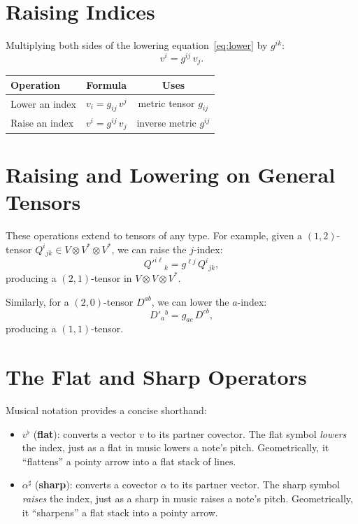\documentclass[12pt, a4paper]{report}
\theoremstyle{definition}
\theoremstyle{plain}
\theoremstyle{remark}
\begin{document}
\section{Raising Indices}

Multiplying both sides of the lowering equation~\eqref{eq:lower} by $g^{ik}$:
\begin{equation}\label{eq:raise}
    \boxed{v^{i} = g^{ij}\, v_j.}
\end{equation}

\begin{center}
\renewcommand{\arraystretch}{1.3}
\begin{tabular}{lcc}
    \toprule
    \textbf{Operation} & \textbf{Formula} & \textbf{Uses} \\
    \midrule
    Lower an index & $v_i = g_{ij}\,v^{j}$ & metric tensor $g_{ij}$ \\
    Raise an index & $v^{i} = g^{ij}\,v_j$  & inverse metric $g^{ij}$ \\
    \bottomrule
\end{tabular}
\end{center}

\section{Raising and Lowering on General Tensors}

These operations extend to tensors of any type.  For example, given a $(1,2)$-tensor
$Q^{i}{}_{jk} \in V \otimes V^* \otimes V^*$, we can raise the $j$-index:
\[
    Q'^{i\ell}{}_{k} = g^{\ell j}\, Q^{i}{}_{jk},
\]
producing a $(2,1)$-tensor in $V \otimes V \otimes V^*$.

Similarly, for a $(2,0)$-tensor $D^{ab}$, we can lower the $a$-index:
\[
    D'_{a}{}^{b} = g_{ac}\, D^{cb},
\]
producing a $(1,1)$-tensor.

\section{The Flat and Sharp Operators}

Musical notation provides a concise shorthand:

\begin{itemize}[nosep]
    \item $v^{\flat}$ (\textbf{flat}): converts a vector $v$ to its partner
          covector.  The flat symbol \emph{lowers} the index, just as a flat in
          music lowers a note's pitch.  Geometrically, it ``flattens'' a pointy
          arrow into a flat stack of lines.
    \item $\alpha^{\sharp}$ (\textbf{sharp}): converts a covector $\alpha$ to its
          partner vector.  The sharp symbol \emph{raises} the index, just as a
          sharp in music raises a note's pitch.  Geometrically, it ``sharpens'' a
          flat stack into a pointy arrow.
\end{itemize}
\end{document}
